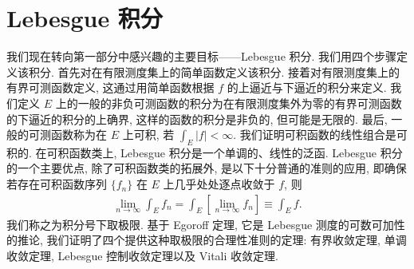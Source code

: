 \documentclass[../main.tex]{subfiles}
\begin{document}
\chapter{Lebesgue 积分}\label{chapter:ch04-Lebesgue积分}

我们现在转向第一部分中感兴趣的主要目标——Lebesgue 积分. 我们用四个步骤定义该积分. 首先对在有限测度集上的简单函数定义该积分. 接着对有限测度集上的有界可测函数定义, 这通过用简单函数根据 $f$ 的上逼近与下逼近的积分来定义. 我们定义 $E$ 上的一般的非负可测函数的积分为在有限测度集外为零的有界可测函数的下逼近的积分的上确界, 这样的函数的积分是非负的, 但可能是无限的. 最后, 一般的可测函数称为在 $E$ 上可积, 若 $\int_{E}|f|<\infty$. 我们证明可积函数的线性组合是可积的. 在可积函数类上, Lebesgue 积分是一个单调的、线性的泛函. Lebesgue 积分的一个主要优点, 除了可积函数类的拓展外, 是以下十分普通的准则的应用, 即确保若存在可积函数序列 $\{f_{n}\}$ 在 $E$ 上几乎处处逐点收敛于 $f$, 则
\begin{align*}
\lim_{n\to\infty}\int_{E}f_{n}=\int_{E}\left[\lim_{n\to\infty}f_{n}\right]\equiv\int_{E}f.
\end{align*}
我们称之为积分号下取极限. 基于 Egoroff 定理, 它是 Lebesgue 测度的可数可加性的推论, 我们证明了四个提供这种取极限的合理性准则的定理: 有界收敛定理, 单调收敛定理, Lebesgue 控制收敛定理以及 Vitali 收敛定理.












\end{document}

